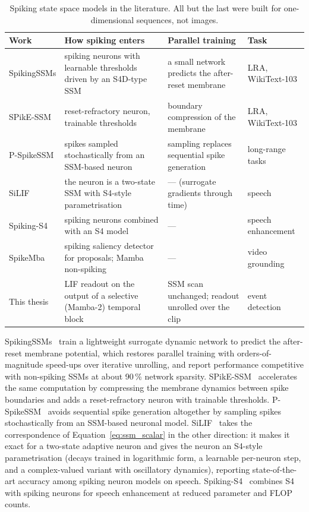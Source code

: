 \documentclass[11pt, a4paper]{report}
\begin{document}
\begin{table}[htbp]
\centering
\small
\caption[Spiking state space models]{Spiking state space models in the literature. All but the last were built for one-dimensional sequences, not
    images.}
\label{tab:spiking_ssm}
\begin{tabularx}{\textwidth}{@{}l>{\raggedright\arraybackslash}X>{\raggedright\arraybackslash}Xl@{}}
\toprule
\textbf{Work} & \textbf{How spiking enters} & \textbf{Parallel training} & \textbf{Task} \\
\midrule
SpikingSSMs \cite{shen2025spikingssms} & spiking neurons with learnable thresholds driven by an S4D-type SSM &
  a small network predicts the after-reset membrane & LRA, WikiText-103 \\
SPikE-SSM \cite{zhong2024spike} & reset-refractory neuron, trainable thresholds & boundary compression of
  the membrane & LRA, WikiText-103 \\
P-SpikeSSM \cite{bal2025p} & spikes sampled stochastically from an SSM-based neuron & sampling replaces
  sequential spike generation & long-range tasks \\
SiLIF \cite{fabre2025silif} & the neuron is a two-state SSM with S4-style parametrisation & --- (surrogate
  gradients through time) & speech \\
Spiking-S4 \cite{du2023spiking} & spiking neurons combined with an S4 model & --- & speech enhancement \\
SpikeMba \cite{li2024spikemba} & spiking saliency detector for proposals; Mamba non-spiking & --- &
  video grounding \\
\midrule
This thesis & LIF readout on the output of a selective (Mamba-2) temporal block & SSM scan unchanged;
  readout unrolled over the clip & event detection \\
\bottomrule
\end{tabularx}
\end{table}

SpikingSSMs~\cite{shen2025spikingssms} train a lightweight surrogate dynamic network to predict the
after-reset membrane potential, which restores parallel training with orders-of-magnitude speed-ups over
iterative unrolling, and report performance competitive with non-spiking SSMs at about 90\,\% network
sparsity. SPikE-SSM~\cite{zhong2024spike} accelerates the same computation by compressing the membrane
dynamics between spike boundaries and adds a reset-refractory neuron with trainable thresholds.
P-SpikeSSM~\cite{bal2025p} avoids sequential spike generation altogether by sampling spikes stochastically
from an SSM-based neuronal model. SiLIF~\cite{fabre2025silif} takes the correspondence of
Equation~\eqref{eq:ssm_scalar} in the other direction: it makes it exact for a two-state adaptive neuron and
gives the neuron an S4-style parametrisation (decays trained in logarithmic form, a learnable per-neuron step,
and a complex-valued variant with oscillatory dynamics), reporting state-of-the-art accuracy among spiking
neuron models on speech. Spiking-S4~\cite{du2023spiking} combines S4 with spiking neurons for speech
enhancement at reduced parameter and FLOP counts.
\end{document}
